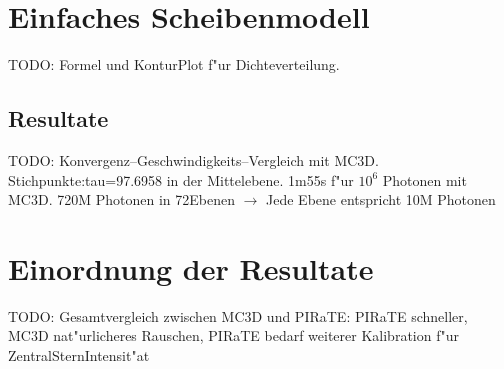 	\section{Einfaches Scheibenmodell}
	TODO: Formel und KonturPlot f"ur Dichteverteilung.
	\subsection{Resultate}
	TODO: Konvergenz--Geschwindigkeits--Vergleich mit MC3D.
	Stichpunkte:tau=97.6958 in der Mittelebene. 1m55s f"ur $10^6$ Photonen mit MC3D. 720M Photonen in 72Ebenen $\rightarrow$ Jede Ebene entspricht 10M Photonen
	\section{Einordnung der Resultate}
	TODO: Gesamtvergleich zwischen MC3D und PIRaTE: PIRaTE schneller, MC3D nat"urlicheres Rauschen, PIRaTE bedarf weiterer Kalibration f"ur ZentralSternIntensit"at